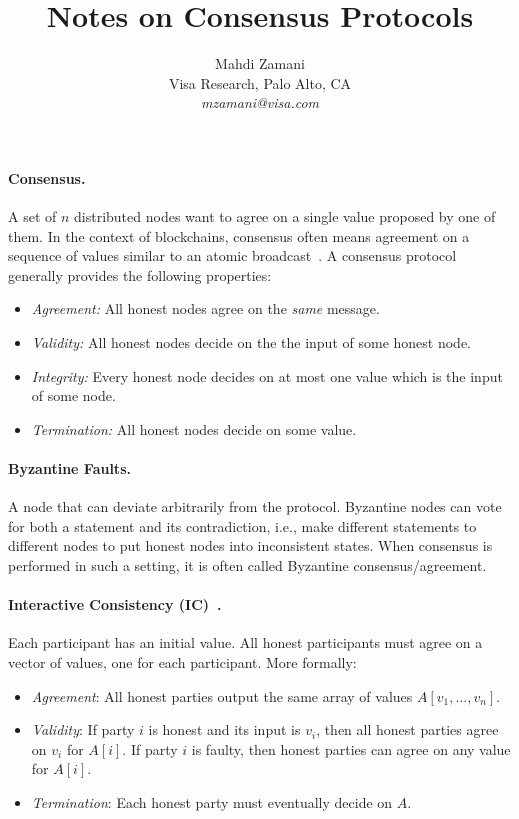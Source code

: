 \documentclass[11pt]{article}
\theoremstyle{mytheoremstyle}
\begin{document}
\title{Notes on Consensus Protocols}

\author{Mahdi Zamani\\ Visa Research, Palo Alto, CA \\ \textit{mzamani@visa.com}}
\date{}

\maketitle

\paragraph{Consensus.}
A set of $n$ distributed nodes want to agree on a single value proposed by one of them. In the context of blockchains, consensus often means agreement on a sequence of values similar to an atomic broadcast~\cite{DBLP:journals/corr/CachinV17}. A consensus protocol generally provides the following properties:

\begin{itemize}
	\item \textit{Agreement:} All honest nodes agree on the \emph{same} message.
	\item \textit{Validity:} All honest nodes decide on the the input of some honest node.
	\item \textit{Integrity:} Every honest node decides on at most one value which is the input of some node.
	\item \textit{Termination:} All honest nodes decide on some value.
\end{itemize}

\paragraph{Byzantine Faults.} A node that can deviate arbitrarily from the protocol. Byzantine nodes can vote for both a statement and its contradiction, i.e., make different statements to different nodes to put honest nodes into inconsistent states. When consensus is performed in such a setting, it is often called Byzantine consensus/agreement.

\paragraph{Interactive Consistency (IC)~\cite{pease1980reaching}.} Each participant has an initial value. All honest participants must agree on a vector of values, one for each participant. More formally:
\begin{itemize}
\item \emph{Agreement}: All honest parties output the same array of values $A[v_1,...,v_n]$. 
\item \emph{Validity}: If party $i$ is honest and its input is $v_i$, then all honest parties agree on $v_i$ for $A[i]$. If party $i$ is faulty, then honest parties can agree on any value for $A[i]$.
\item \emph{Termination}: Each honest party must eventually decide on $A$.
\end{itemize}
\end{document}
